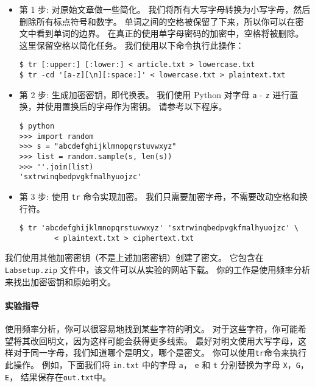 \begin{itemize}

\item 第 1 步:
对原始文章做一些简化。
我们将所有大写字母转换为小写字母，然后删除所有标点符号和数字。
单词之间的空格被保留了下来，所以你可以在密文中看到单词的边界。
在真正的使用单字母密码的加密中，空格将被删除。
这里保留空格以简化任务。
我们使用以下命令执行此操作：

\begin{lstlisting}
$ tr [:upper:] [:lower:] < article.txt > lowercase.txt
$ tr -cd '[a-z][\n][:space:]' < lowercase.txt > plaintext.txt
\end{lstlisting}


\item 第 2 步:
生成加密密钥，即代换表。
我们使用 Python 对字母 \texttt{a} - \texttt{z} 进行置换，并使用置换后的字母作为密钥。
请参考以下程序。

\begin{lstlisting}
$ python
>>> import random
>>> s = "abcdefghijklmnopqrstuvwxyz"
>>> list = random.sample(s, len(s))
>>> ''.join(list)
'sxtrwinqbedpvgkfmalhyuojzc'
\end{lstlisting}


\item 第 3 步:
使用 \texttt{tr} 命令实现加密。
我们只需要加密字母，不需要改动空格和换行符。


\begin{lstlisting}
$ tr 'abcdefghijklmnopqrstuvwxyz' 'sxtrwinqbedpvgkfmalhyuojzc' \
        < plaintext.txt > ciphertext.txt
\end{lstlisting}

\end{itemize}


我们使用其他加密密钥（不是上述加密密钥）创建了密文。
它包含在 \texttt{Labsetup.zip} 文件中，该文件可以从实验的网站下载。
你的工作是使用频率分析来找出加密密钥和原始明文。


\paragraph{实验指导}
使用频率分析，你可以很容易地找到某些字符的明文。
对于这些字符，你可能希望将其改回明文，因为这样可能会获得更多线索。
最好对明文使用大写字母，这样对于同一字母，我们知道哪个是明文，哪个是密文。
你可以使用\texttt{tr}命令来执行此操作。
例如，下面我们将 \texttt{in.txt} 中的字母 \texttt{a}， \texttt{e} 和 \texttt{t}
分别替换为字母 \texttt{X}，\texttt{G}，\texttt{E}， 结果保存在\texttt{out.txt}中。


